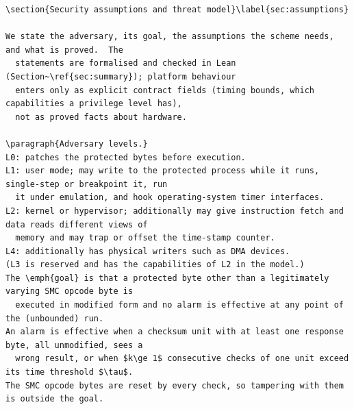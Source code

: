 \documentclass[9pt,twocolumn]{article}
\begin{document}
\begin{small}\begin{verbatim}
\section{Security assumptions and threat model}\label{sec:assumptions}

We state the adversary, its goal, the assumptions the scheme needs, and what is proved.  The
  statements are formalised and checked in Lean (Section~\ref{sec:summary}); platform behaviour
  enters only as explicit contract fields (timing bounds, which capabilities a privilege level has),
  not as proved facts about hardware.

\paragraph{Adversary levels.}
L0: patches the protected bytes before execution.
L1: user mode; may write to the protected process while it runs, single-step or breakpoint it, run
  it under emulation, and hook operating-system timer interfaces.
L2: kernel or hypervisor; additionally may give instruction fetch and data reads different views of
  memory and may trap or offset the time-stamp counter.
L4: additionally has physical writers such as DMA devices.
(L3 is reserved and has the capabilities of L2 in the model.)
The \emph{goal} is that a protected byte other than a legitimately varying SMC opcode byte is
  executed in modified form and no alarm is effective at any point of the (unbounded) run.
An alarm is effective when a checksum unit with at least one response byte, all unmodified, sees a
  wrong result, or when $k\ge 1$ consecutive checks of one unit exceed its time threshold $\tau$.
The SMC opcode bytes are reset by every check, so tampering with them is outside the goal.


\end{verbatim}
\end{small}
\end{document}
